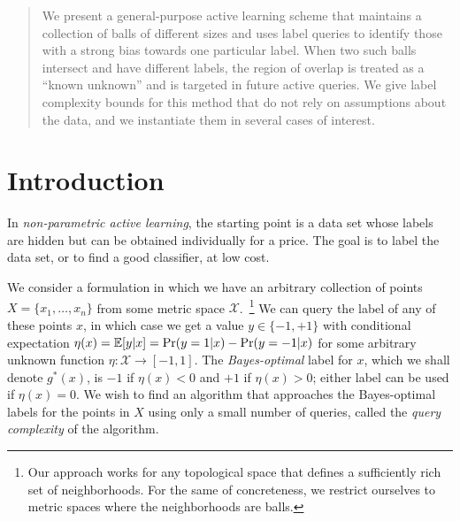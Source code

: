 \documentclass[twoside]{article}
\def\pr{{\rm Pr}}
\def\E{{\mathbb E}}
\def\X{{\mathcal X}}
\begin{document}
%

%



\begin{abstract}%
  We present a general-purpose active learning scheme that maintains a
  collection of balls of different sizes and uses label
  queries to identify those with a strong bias towards one particular
  label. When two such balls intersect and have different
  labels, the region of overlap is treated as a ``known unknown'' and
  is targeted in future active queries. We give label complexity
  bounds for this method that do not rely on assumptions about the
  data, and we instantiate them in several cases of interest.
\end{abstract}

\section{Introduction}

In \emph{non-parametric active learning}, the starting point is a data
set whose labels are hidden but can be obtained individually for a
price. The goal is to label the data set, or to find a good
classifier, at low cost.

We consider a formulation in which we have an arbitrary collection of
points $X = \{x_1, \ldots, x_n\}$ from some metric space
$\X$.~\footnote{Our approach works for any topological space
  that defines a sufficiently rich set of neighborhoods. For the same of concreteness, we
  restrict ourselves to metric spaces where the neighborhoods are balls.}  We can
query the label of any of these points $x$, in which case we get a
value $y \in \{-1, +1\}$ with conditional expectation
$ \eta(x) = \E[y | x] = \pr(y=1|x) - \pr(y=-1|x) $ for some arbitrary
unknown function $\eta: \X \to [-1,1]$. The \emph{Bayes-optimal} label
for $x$, which we shall denote $g^*(x)$, is $-1$ if $\eta(x) < 0$ and
$+1$ if $\eta(x) > 0$; either label can be used if $\eta(x) = 0$.  We
wish to find an algorithm that approaches the Bayes-optimal labels for
the points in $X$ using only a small number of queries, called the
{\em query complexity} of the algorithm.
\end{document}
